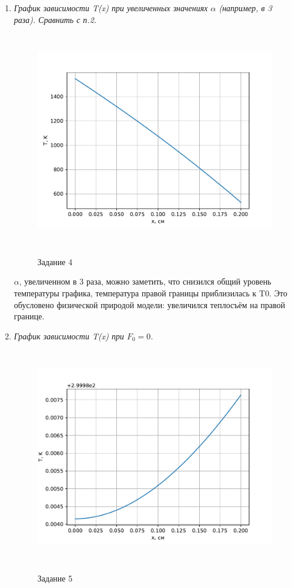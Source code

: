 \begin{enumerate}
	\newpage
	\item \textit{График зависимости T(x) при увеличенных значениях $\alpha$ (например, в 3 раза). Сравнить с п.2.}
	
	\begin{figure}[h]
		\begin{center}
			{\includegraphics[height=9.5cm, width = 18cm]{../pictures/Figure_3}}
			\caption{Задание 4}
		\end{center}
	\end{figure}

	 $\alpha$, увеличенном в 3 раза, можно заметить, что снизился общий уровень температуры графика, температура правой границы приблизилась к T0. Это обусловено физической природой модели: увеличился теплосъём на правой границе.
	
	\newpage
	\item \textit{График зависимости T(x) при $F_0 = 0$.}
	
	\begin{figure}[h]
		\begin{center}
			{\includegraphics[height=9.5cm, width = 18cm]{../pictures/Figure_4}}
			\caption{Задание 5}
		\end{center}
	\end{figure}
	

\end{enumerate}
